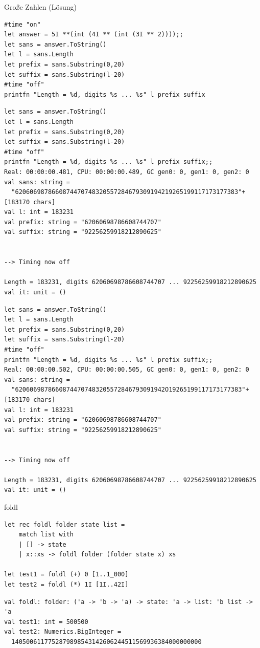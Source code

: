 \documentclass[t]{beamer}
\begin{document}
\begin{frame}[label={sec:org3181c45},fragile]{Große Zahlen (Lösung)}
 \begin{verbatim}
#time "on"
let answer = 5I **(int (4I ** (int (3I ** 2))));;
let sans = answer.ToString()
let l = sans.Length
let prefix = sans.Substring(0,20)
let suffix = sans.Substring(l-20)
#time "off"
printfn "Length = %d, digits %s ... %s" l prefix suffix
\end{verbatim}

\begin{verbatim}
let sans = answer.ToString()
let l = sans.Length
let prefix = sans.Substring(0,20)
let suffix = sans.Substring(l-20)
#time "off"
printfn "Length = %d, digits %s ... %s" l prefix suffix;;
Real: 00:00:00.481, CPU: 00:00:00.489, GC gen0: 0, gen1: 0, gen2: 0
val sans: string =
  "6206069878660874470748320557284679309194219265199117173177383"+[183170 chars]
val l: int = 183231
val prefix: string = "62060698786608744707"
val suffix: string = "92256259918212890625"


--> Timing now off

Length = 183231, digits 62060698786608744707 ... 92256259918212890625
val it: unit = ()
\end{verbatim}

\scriptsize
\begin{verbatim}
let sans = answer.ToString()
let l = sans.Length
let prefix = sans.Substring(0,20)
let suffix = sans.Substring(l-20)
#time "off"
printfn "Length = %d, digits %s ... %s" l prefix suffix;;
Real: 00:00:00.502, CPU: 00:00:00.505, GC gen0: 0, gen1: 0, gen2: 0
val sans: string =
  "62060698786608744707483205572846793091942O19265199117173177383"+[183170 chars]
val l: int = 183231
val prefix: string = "62060698786608744707"
val suffix: string = "92256259918212890625"


--> Timing now off

Length = 183231, digits 62060698786608744707 ... 92256259918212890625
val it: unit = ()
\end{verbatim}
\end{frame}

\begin{frame}[label={sec:org927bff6},fragile]{foldl}
 \begin{verbatim}
let rec foldl folder state list = 
    match list with
    | [] -> state
    | x::xs -> foldl folder (folder state x) xs

let test1 = foldl (+) 0 [1..1_000]
let test2 = foldl (*) 1I [1I..42I]
\end{verbatim}

\begin{verbatim}
val foldl: folder: ('a -> 'b -> 'a) -> state: 'a -> list: 'b list -> 'a
val test1: int = 500500
val test2: Numerics.BigInteger =
  1405006117752879898543142606244511569936384000000000
\end{verbatim}
\end{frame}
\end{document}
